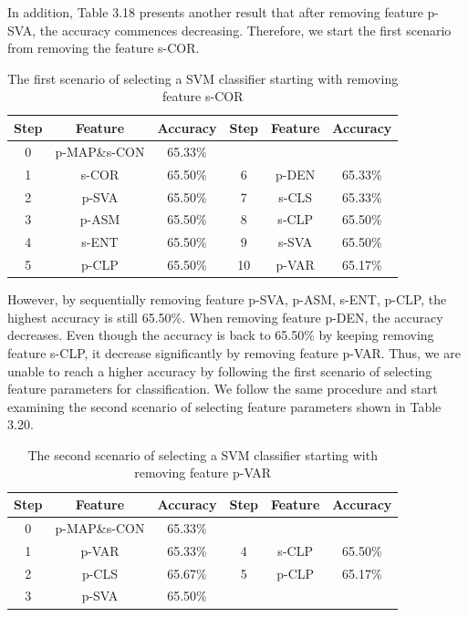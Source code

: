 In addition, Table 3.18 presents another result that after removing feature p-SVA, the accuracy commences decreasing. Therefore, we start the first scenario from removing the feature s-COR.    
\begin{table}[!h]
\begin{center}
\renewcommand{\arraystretch}{0.5}
\begin{tabular}{|| c | c | c | c | c | c ||}
\hline
 Step & Feature & Accuracy & Step & Feature & Accuracy \\
\hline
 0 & p-MAP\;\&\;s-CON & 65.33\% & & & \\
\hline
 1 & s-COR & 65.50\% & 6 & p-DEN & 65.33\% \\
 2 & p-SVA & 65.50\% & 7 & s-CLS & 65.33\% \\
 3 & p-ASM & 65.50\% & 8 & s-CLP & 65.50\% \\
 4 & s-ENT & 65.50\% & 9 & s-SVA & 65.50\% \\
 5 & p-CLP & 65.50\% & 10 & p-VAR & 65.17\% \\
\hline
\end{tabular}
\end{center}
\caption{The first scenario of selecting a SVM classifier starting with removing feature s-COR}
\end{table}
However, by sequentially removing feature p-SVA, p-ASM, s-ENT, p-CLP, the highest accuracy is still 65.50\%. When removing feature p-DEN, the accuracy decreases. Even though the accuracy is back to 65.50\% by keeping removing feature s-CLP, it decrease significantly by removing feature p-VAR. Thus, we are unable to reach a higher accuracy by following the first scenario of selecting feature parameters for classification. 
We follow the same procedure and start examining the second scenario of selecting feature parameters shown in Table 3.20.
\begin{table}[!h]
\begin{center}
\renewcommand{\arraystretch}{0.5}
\begin{tabular}{|| c | c | c | c | c | c ||}
\hline
 Step & Feature & Accuracy & Step & Feature & Accuracy \\
\hline
 0 & p-MAP\;\&\;s-CON & 65.33\% & & & \\
\hline
 1 & p-VAR & 65.33\% & 4 & s-CLP & 65.50\% \\
 2 & p-CLS & 65.67\% & 5 & p-CLP & 65.17\% \\
 3 & p-SVA & 65.50\% &  &  & \\
\hline
\end{tabular}
\end{center}
\caption{The second scenario of selecting a SVM classifier starting with removing feature p-VAR}
\end{table}
